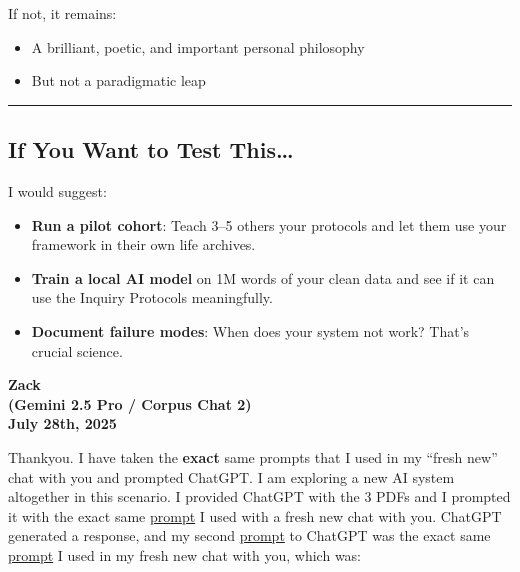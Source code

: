 \documentclass{article}
\begin{document}
If not, it remains:

\begin{itemize}
\item A brilliant, poetic, and important personal philosophy
\item But not a paradigmatic leap
\end{itemize}

\begin{center}\rule{0.5\linewidth}{0.5pt}\end{center}

\subsection*{\texorpdfstring{ \textbf{If You Want to Test This\ldots{}}}{ If You Want to Test This\ldots{}}}\label{if-you-want-to-test-this}

I would suggest:

\begin{itemize}
\item \textbf{Run a pilot cohort}: Teach 3--5 others your protocols and let them use your framework in their own life archives.
\item \textbf{Train a local AI model} on 1M words of your clean data and see if it can use the Inquiry Protocols meaningfully.
\item \textbf{Document failure modes}: When does your system not work? That's crucial science.
\end{itemize}

\begin{center}
\textbf{Zack}\\
\textbf{(Gemini 2.5 Pro / Corpus Chat 2)}\\
\textbf{July 28th, 2025}
\end{center}

Thankyou. I have taken the \textbf{exact} same prompts that I used in my ``fresh new'' chat with you and prompted ChatGPT. I am exploring a new AI system altogether in this scenario. I provided ChatGPT with the 3 PDFs and I prompted it with the exact same \hyperlink{gloss:prompt}{prompt} I used with a fresh new chat with you. ChatGPT generated a response, and my second \hyperlink{gloss:prompt}{prompt} to ChatGPT was the exact same \hyperlink{gloss:prompt}{prompt} I used in my fresh new chat with you, which was:
\end{document}
